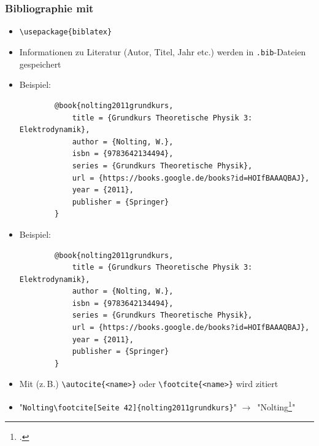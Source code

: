 \section{}

\begin{frame}[<+->][fragile]
	\frametitle{Bibliographie mit }
	
	\begin{itemize}
		\item \lstinline!\usepackage{biblatex}!
		\item Informationen zu Literatur (Autor, Titel, Jahr etc.) werden in \texttt{.bib}-Dateien gespeichert
		\item Beispiel:
		\begin{lstlisting}
		@book{nolting2011grundkurs,
		    title = {Grundkurs Theoretische Physik 3: Elektrodynamik},
		    author = {Nolting, W.},
		    isbn = {9783642134494},
		    series = {Grundkurs Theoretische Physik},
		    url = {https://books.google.de/books?id=HOIfBAAAQBAJ},
		    year = {2011},
		    publisher = {Springer}
		}
		\end{lstlisting}
	\end{itemize}
\end{frame}

\begin{frame}[<+->][fragile]
	\begin{itemize}
		\item Beispiel:
		\begin{lstlisting}
		@book{nolting2011grundkurs,
		    title = {Grundkurs Theoretische Physik 3: Elektrodynamik},
		    author = {Nolting, W.},
		    isbn = {9783642134494},
		    series = {Grundkurs Theoretische Physik},
		    url = {https://books.google.de/books?id=HOIfBAAAQBAJ},
		    year = {2011},
		    publisher = {Springer}
		}
		\end{lstlisting}
		\item Mit (z.\,B.) \lstinline!\autocite{<name>}! oder \lstinline!\footcite{<name>}! wird zitiert
		\item "\lstinline!Nolting\footcite[Seite 42]{nolting2011grundkurs}!" $\rightarrow$~"Nolting\footcite[Seite 42]{nolting2011grundkurs}"
	\end{itemize}
\end{frame}

